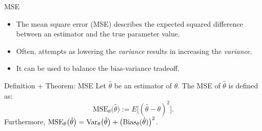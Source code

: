 \begin{frame}[allowframebreaks]{MSE}
  \begin{itemize}
    \item The mean square error (MSE) describes the expected squared difference between an estimator and the true parameter value.
    \item Often, attempts as lowering the \emph{variance} results in increasing the \emph{variance}.
    \item It can be used to balance the bias-variance tradeoff.
  \end{itemize}

  \begin{block}{Definition + Theorem: MSE}
    Let $\hat{\theta}$ be an estimator of $\theta$. The MSE of $\hat{\theta}$ is defined as:
    $$
    \text{MSE}_\theta\big(\hat{\theta}\big) := E\big[(\hat{\theta} - \theta)^2\big].
    $$
    Furthermore, $\text{MSE}_\theta\big(\hat{\theta}\big) = \mathrm{Var}_\theta\big(\hat{\theta}\big) + \big(\text{Bias}_\theta(\hat{\theta})\big)^2$.



\end{block}
\end{frame}
